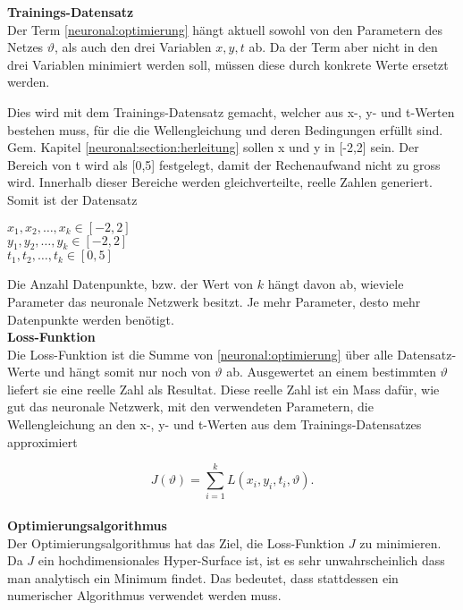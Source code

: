 \textbf{Trainings-Datensatz}\\
Der Term \eqref{neuronal:optimierung} hängt aktuell sowohl von den Parametern des Netzes \( \vartheta \), als auch den drei Variablen \( x, y, t \) ab.
Da der Term aber nicht in den drei Variablen minimiert werden soll, müssen diese durch konkrete Werte ersetzt werden.

Dies wird mit dem Trainings-Datensatz gemacht, welcher aus x-, y- und t-Werten bestehen muss, für die die Wellengleichung und deren Bedingungen erfüllt sind.
Gem. Kapitel \ref{neuronal:section:herleitung} sollen x und y in [-2,2] sein.
Der Bereich von t wird als [0,5] festgelegt, damit der Rechenaufwand nicht zu gross wird.
Innerhalb dieser Bereiche werden gleichverteilte, reelle Zahlen generiert.
Somit ist der Datensatz
\begin{center}
    \( x_1, x_2, \ldots, x_k \in [-2,2] \)\\
    \( y_1, y_2, \ldots, y_k \in [-2,2] \)\\
    \( t_1, t_2, \ldots, t_k \in [0,5] \)\\
\end{center}

Die Anzahl Datenpunkte, bzw. der Wert von \( k \) hängt davon ab, wieviele Parameter das neuronale Netzwerk besitzt.
Je mehr Parameter, desto mehr Datenpunkte werden benötigt.\\


\textbf{Loss-Funktion}\\
Die Loss-Funktion ist die Summe von \eqref{neuronal:optimierung} über alle Datensatz-Werte und hängt somit nur noch von \( \vartheta \) ab. 
Ausgewertet an einem bestimmten \( \vartheta \) liefert sie eine reelle Zahl als Resultat.
Diese reelle Zahl ist ein Mass dafür, wie gut das neuronale Netzwerk, mit den verwendeten Parametern, die Wellengleichung an den x-, y- und t-Werten aus dem Trainings-Datensatzes approximiert

\begin{equation}
    J(\vartheta) = \sum_{i=1}^{k} L(x_i, y_i, t_i, \vartheta).
    \label{neuronal:loss}
\end{equation}\\

\textbf{Optimierungsalgorithmus}\\
Der Optimierungsalgorithmus hat das Ziel, die Loss-Funktion \( J \) zu minimieren.
Da \( J \) ein hochdimensionales Hyper-Surface ist, ist es sehr unwahrscheinlich dass man analytisch ein Minimum findet.
Das bedeutet, dass stattdessen ein numerischer Algorithmus verwendet werden muss.\\

